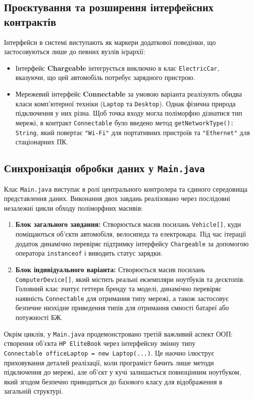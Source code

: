 \subsection{Проєктування та розширення інтерфейсних контрактів}

Інтерфейси в системі виступають як маркери додаткової поведінки, що застосовуються лише до певних вузлів ієрархії:
\begin{itemize}
    \item Інтерфейс \textbf{Chargeable} інтегрується виключно в 
    клас \texttt{ElectricCar}, вказуючи, що цей автомобіль потребує 
    зарядного пристрою.
    \item Мережевий інтерфейс \textbf{Connectable} за умовою 
    варіанта реалізують обидва класи комп'ютерної техніки (\texttt{Laptop} 
    та \texttt{Desktop}). Однак фізична природа підключення у них різна. 
    Щоб точка входу могла поліморфно дізнатися тип мережі, в контракт 
    \texttt{Connectable} було введено метод \texttt{getNetworkType(): String}, 
    який повертає \texttt{"Wi-Fi"} для портативних пристроїв та \texttt{"Ethernet"} 
    для стаціонарних ПК.
\end{itemize}

\subsection{Синхронізація обробки даних у \texttt{Main.java}}
Клас \texttt{Main.java} виступає в ролі центрального контролера та єдиного середовища 
представлення даних. Виконання двох завдань реалізовано через послідовні незалежні 
цикли обходу поліморфних масивів:
\begin{enumerate}
    \item \textbf{Блок загального завдання:} 
    Створюється масив посилань \texttt{Vehicle[]}, куди поміщаються об'єкти автомобіля, 
    велосипеда та електрокара. Під час ітерації додаток динамічно перевіряє підтримку 
    інтерфейсу \texttt{Chargeable} за допомогою оператора \texttt{instanceof} і виводить 
    статус зарядки.
    \item \textbf{Блок індивідуального варіанта:} 
    Створюється масив посилань \texttt{ComputerDevice[]}, який містить реальні екземпляри 
    ноутбуків та десктопів. Головний клас зчитує геттери бренду та моделі, динамічно 
    перевіряє наявність \texttt{Connectable} для отримання типу мережі, а також застосовує 
    безпечне низхідне приведення типів для отримання ємності батареї або потужності БЖ.
\end{enumerate}

Окрім циклів, у \texttt{Main.java} продемонстровано третій важливий аспект ООП: створення 
об'єкта \texttt{HP EliteBook} через інтерфейсну змінну типу \\
\texttt{Connectable officeLaptop = new Laptop(...)}. Це наочно ілюструє приховування 
деталей реалізації, коли програміст бачить лише методи підключення до мережі, але об'єкт 
у кучі залишається повноцінним ноутбуком, який згодом безпечно приводиться до базового 
класу для відображення в загальній структурі.